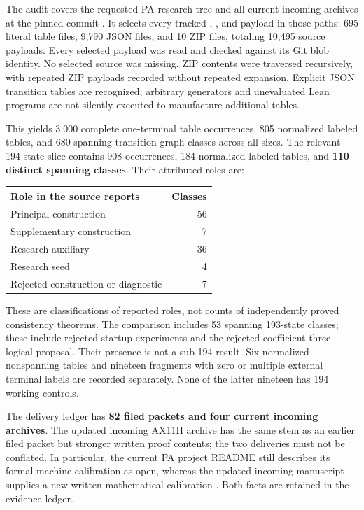 \documentclass[10pt,letterpaper]{article}
\newcommand{\file}[1]{\texttt{\path{#1}}}
\begin{document}
The audit covers the requested PA research tree and all current incoming
archives at the pinned commit \cite{snapshot,pa-status}. It selects every
tracked \file{.tm}, \file{.json}, and \file{.zip} payload in those paths:
695 literal table files, 9,790 JSON files, and 10 ZIP files, totaling
10,495 source payloads. Every selected payload was read and checked
against its Git blob identity. No selected source was missing.
ZIP contents were traversed recursively, with repeated ZIP payloads
recorded without repeated expansion. Explicit JSON transition tables are
recognized; arbitrary generators and unevaluated Lean programs are not
silently executed to manufacture additional tables.

This yields 3,000 complete one-terminal table occurrences, 805 normalized
labeled tables, and 680 spanning transition-graph classes across all sizes.
The relevant 194-state slice contains 908 occurrences, 184 normalized
labeled tables, and \textbf{110 distinct spanning classes}. Their attributed
roles are:
\begin{center}
\begin{tabular}{lr}\toprule
Role in the source reports&Classes\\\midrule
Principal construction&56\\
Supplementary construction&7\\
Research auxiliary&36\\
Research seed&4\\
Rejected construction or diagnostic&7\\\bottomrule
\end{tabular}
\end{center}
These are classifications of reported roles, not counts of independently
proved consistency theorems. The comparison includes 53 spanning
193-state classes; these include rejected startup experiments and the
rejected coefficient-three logical proposal. Their presence is not a
sub-194 result. Six normalized nonspanning tables and nineteen fragments
with zero or multiple external terminal labels are recorded separately.
None of the latter nineteen has 194 working controls.

The delivery ledger has \textbf{82 filed packets and four current incoming
archives}. The updated incoming AX11H archive has the same stem as an
earlier filed packet but stronger written proof contents; the two deliveries
must not be conflated. In particular, the current PA project README still
describes its formal machine calibration as open, whereas the updated
incoming manuscript supplies a new written mathematical calibration
\cite{pa-status,ax11h}. Both facts are retained in the evidence ledger.
\end{document}
